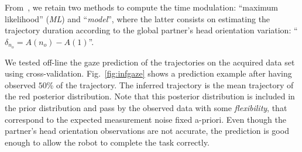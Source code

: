 \documentclass[runningheads,a4paper]{llncs}
\begin{document}
From~\cite{oriane2017}, we retain two methods to compute the time modulation: ``maximum likelihood'' (\textit{ML}) and ``\textit{model}'', where the latter consists on estimating the trajectory duration according to the global partner's head orientation variation:
``$\delta_{n_o} = A(n_o) - A(1)$''.

We tested off-line the gaze prediction of the trajectories on the acquired data set using cross-validation.
Fig.~\ref{fig:infgaze} shows a prediction example after having observed $50$\% of the trajectory. The inferred trajectory is the mean trajectory of the red posterior distribution. Note that this posterior distribution is included in the prior distribution and pass by the observed data with some \textit{flexibility}, that correspond to the expected measurement noise fixed a-priori.
Even though the partner's head orientation observations are not accurate, the prediction is good enough to allow the robot to complete the task correctly.
\end{document}
